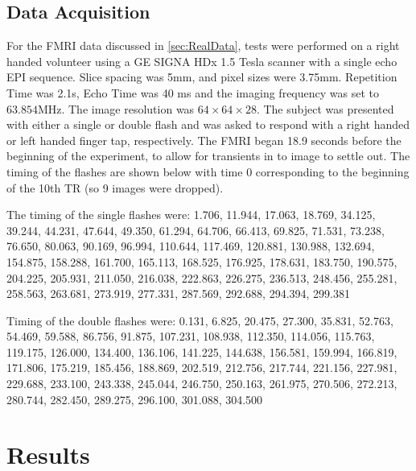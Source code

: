 \documentclass[journal]{./IEEEtran}
\begin{document}
\subsection{Data Acquisition}
\label{sec:MethodsData}
For the FMRI data discussed in \autoref{sec:RealData}, tests were
performed on a right handed volunteer using a GE SIGNA HDx 1.5 Tesla
scanner with a single echo EPI sequence. Slice spacing was
5mm, and pixel sizes were 3.75mm.  Repetition Time was 2.1s,
Echo Time was 40 ms and the imaging frequency was set to $63.854$MHz.
The image resolution was $64 \times 64 \times 28$.
The subject was presented with either a single or
double flash and was asked to respond with a right handed
or left handed finger tap, respectively. The FMRI began 18.9 seconds
before the beginning of the experiment, to allow for transients
in to image to settle out. The timing of the flashes are shown
below with time 0 corresponding to the beginning of
the 10th TR (so 9 images were dropped).

The timing of the single flashes were:
\small{1.706, 11.944, 17.063, 18.769, 34.125, 39.244, 44.231, 47.644, 49.350, 
61.294, 64.706, 66.413, 69.825, 71.531, 73.238, 76.650, 80.063, 
90.169, 96.994, 110.644, 117.469, 120.881, 130.988, 132.694, 154.875, 
158.288, 161.700, 165.113, 168.525, 176.925, 178.631, 183.750, 190.575, 
204.225, 205.931, 211.050, 216.038, 222.863, 226.275, 236.513, 248.456, 
255.281, 258.563, 263.681, 273.919, 277.331, 287.569, 292.688, 294.394, 
299.381}

Timing of the double flashes were:
\small{ 0.131, 6.825, 20.475, 27.300, 35.831, 52.763, 54.469, 59.588, 86.756, 
91.875, 107.231, 108.938, 112.350, 114.056, 115.763, 119.175, 126.000, 
134.400, 136.106, 141.225, 144.638, 156.581, 159.994, 166.819, 171.806, 
175.219, 185.456, 188.869, 202.519, 212.756, 217.744, 221.156, 227.981, 
229.688, 233.100, 243.338, 245.044, 246.750, 250.163, 261.975, 270.506, 
272.213, 280.744, 282.450, 289.275, 296.100, 301.088, 304.500 }

\section{Results}
\label{sec:Results}
\end{document}
